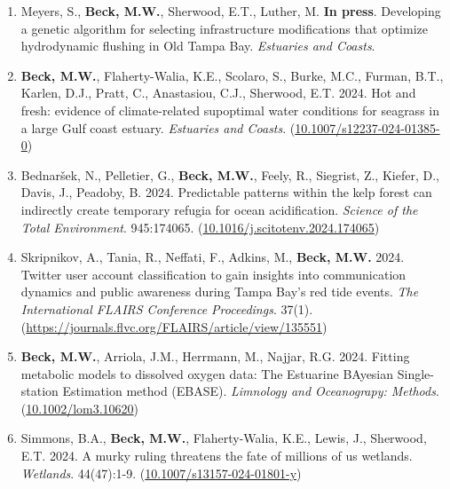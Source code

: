 \documentclass[letterpaper,12pt]{article}
\begin{document}
\begin{enumerate}

\item Meyers, S., \textbf{Beck, M.W.}, Sherwood, E.T., Luther, M. \textbf{In press}. Developing a genetic algorithm for selecting infrastructure modifications that optimize hydrodynamic flushing in Old Tampa Bay. \textit{Estuaries and Coasts}.

\item \textbf{Beck, M.W.}, Flaherty-Walia, K.E., Scolaro, S., Burke, M.C., Furman, B.T., Karlen, D.J., Pratt, C., Anastasiou, C.J., Sherwood, E.T. 2024. Hot and fresh: evidence of climate-related supoptimal water conditions for seagrass in a large Gulf coast estuary. \textit{Estuaries and Coasts}. ({\footnotesize\href{https://doi.org/10.1007/s12237-024-01385-0}{10.1007/s12237-024-01385-0}}) 

\item Bednar\v{s}ek, N., Pelletier, G., \textbf{Beck, M.W.}, Feely, R., Siegrist, Z., Kiefer, D., Davis, J., Peadoby, B. 2024. Predictable patterns within the kelp forest can indirectly create temporary refugia for ocean acidification. \textit{Science of the Total Environment}. 945:174065. ({\footnotesize\href{https://doi.org/10.1016/j.scitotenv.2024.174065}{10.1016/j.scitotenv.2024.174065}}) 

\item Skripnikov, A., Tania, R., Neffati, F., Adkins, M., \textbf{Beck, M.W.} 2024. Twitter user account classification to gain insights into communication dynamics and public awareness during Tampa Bay's red tide events. \textit{The International FLAIRS Conference Proceedings}. 37(1). ({\footnotesize\href{https://journals.flvc.org/FLAIRS/article/view/135551}{https://journals.flvc.org/FLAIRS/article/view/135551}}) 

\item \textbf{Beck, M.W.}, Arriola, J.M., Herrmann, M., Najjar, R.G. 2024. Fitting metabolic models to dissolved oxygen data: The Estuarine BAyesian Single-station Estimation method (EBASE). \textit{Limnology and Oceanograpy: Methods}. ({\footnotesize\href{https://doi.org/10.1002/lom3.10620}{10.1002/lom3.10620}})

\item Simmons, B.A., \textbf{Beck, M.W.}, Flaherty-Walia, K.E., Lewis, J., Sherwood, E.T. 2024. A murky ruling threatens the fate of millions of us wetlands. \textit{Wetlands}. 44(47):1-9. ({\footnotesize\href{https://doi.org/10.1007/s13157-024-01801-y}{10.1007/s13157-024-01801-y}})


\end{enumerate}
\end{document}

